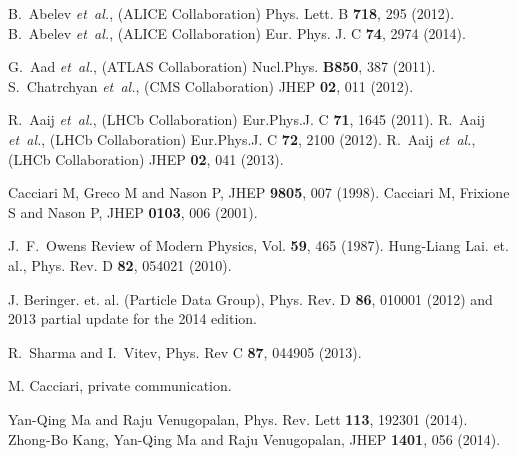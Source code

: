 \documentclass{iopart}
\begin{document}
\begin{thebibliography}{50}
 B.~Abelev {\em et~al.}, (ALICE Collaboration) Phys. Lett. B {\bf 718}, 295 (2012).
 B.~Abelev {\em et~al.}, (ALICE Collaboration) Eur. Phys. J. C {\bf74}, 2974 (2014).

 G.~Aad {\em et~al.}, (ATLAS Collaboration) Nucl.Phys. {\bf B850}, 387 (2011).
 S.~Chatrchyan {\em et~al.}, (CMS Collaboration) JHEP {\bf02}, 011 (2012).

 R.~Aaij {\em et~al.}, (LHCb Collaboration) Eur.Phys.J. C {\bf71}, 1645 (2011).
 R.~Aaij {\em et~al.}, (LHCb Collaboration) Eur.Phys.J. C {\bf72}, 2100 (2012).
 R.~Aaij {\em et~al.}, (LHCb Collaboration) JHEP {\bf02}, 041 (2013).

 Cacciari M, Greco M and Nason P, JHEP {\bf9805}, 007 (1998).
 Cacciari M, Frixione S and Nason P, JHEP {\bf0103}, 006 (2001).

 J.~F.~Owens Review of Modern Physics, Vol. {\bf 59}, 465 (1987).
 Hung-Liang Lai. et. al.,  Phys. Rev. D {\bf 82}, 054021 (2010).



 J. Beringer. et. al. (Particle Data Group), Phys. Rev. D {\bf 86}, 010001 (2012) 
and 2013 partial update for the 2014 edition.
 

 R.~Sharma and I.~Vitev, Phys. Rev C {\bf 87}, 044905 (2013). 

 M. Cacciari, private communication.

 Yan-Qing Ma and Raju Venugopalan, Phys. Rev. Lett {\bf 113}, 192301 (2014).
 Zhong-Bo Kang, Yan-Qing Ma and Raju Venugopalan, JHEP {\bf1401}, 056 (2014).

\end{thebibliography}
\end{document}
